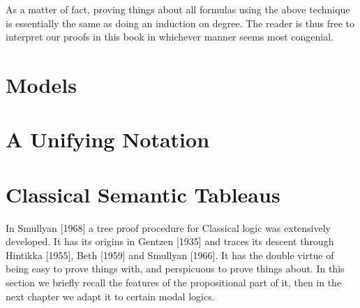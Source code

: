 As a matter of fact, 
proving things about all formulas using the above technique is essentially the same as doing an induction on degree.
% 
The reader is thus free to interpret our proofs in this book in whichever manner seems most congenial.



\section{Models}\label{sec:1-2}





\section{A Unifying Notation}\label{sec:1-3}



\section{Classical Semantic Tableaus}\label{sec:1-4}


In Smullyan [1968] a tree proof procedure for Classical logic was extensively developed. 
% 
It has its origins in Gentzen [1935] and traces its descent through Hintikka [1955], Beth [1959] and Smullyan [1966]. 
% 
It has the double virtue of being easy to prove things with, 
and perspicuous to prove things about. 
% 
In this section we briefly recall the features of the propositional part of it, 
then in the next chapter we adapt it to certain modal logics.




